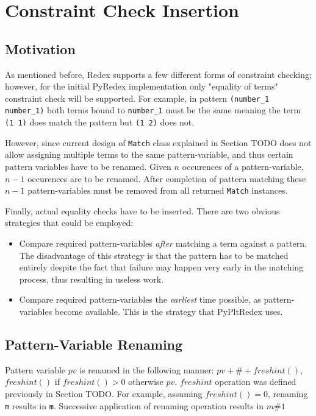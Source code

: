 \section{Constraint Check Insertion}
\subsection{Motivation}
As mentioned before, Redex supports a few different forms of constraint checking; however, for the initial PyRedex implementation only "equality of terms" constraint check will be supported. For example, in pattern \texttt{(number\_1 number\_1)} both terms bound to \texttt{number\_1} must be the same meaning the term \texttt{(1 1)} does match the pattern but \texttt{(1 2)} does not. 

However, since current design of \texttt{Match} class explained in Section TODO does not allow assigning multiple terms to the same pattern-variable, and thus certain pattern variables have to be renamed. Given $n$ occurences of a pattern-variable, $n-1$ occurences are to be renamed. After completion of pattern matching these $n-1$ pattern-variables must be removed from all returned \texttt{Match} instances.

Finally, actual equality checks have to be inserted. There are two obvious strategies that could be employed:

\begin{itemize}
\item Compare required pattern-variables \textit{after} matching a term against a pattern. The disadvantage of this strategy is that the pattern has to be matched entirely despite the fact that failure may happen very early in the matching process, thus resulting in useless work.

\item Compare required pattern-variables the \textit{earliest} time possible, as pattern-variables become available. This is the strategy that PyPltRedex uses.
\end{itemize}

\subsection{Pattern-Variable Renaming}
Pattern variable $pv$ is renamed in the following manner: $pv + \# + freshint()$, $freshint()$ if $freshint() > 0$ otherwise $pv$. $freshint$ operation was defined previously in Section TODO. For example, assuming $freshint()=0$, renaming \texttt{m} results in \texttt{m}. Successive application of renaming operation results in \texttt{$m\#1$}




